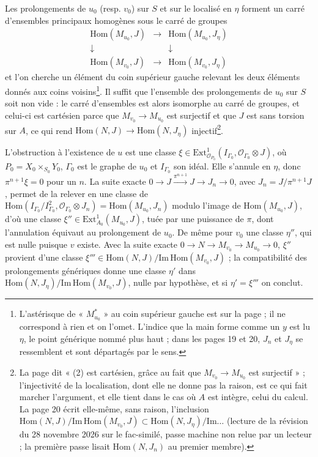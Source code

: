 \documentclass[11pt,a4paper]{article}
\begin{document}
Les prolongements de $u_0$ (resp. $v_0$) sur $S$ et sur le localisé en $\eta$
forment un carré d'ensembles principaux homogènes sous le carré de groupes
\[
\begin{array}{ccc}
\mathrm{Hom}(M_{u_0}, J) & \longrightarrow & \mathrm{Hom}(M_{u_0}, J_\eta)\\
\downarrow & & \downarrow\\
\mathrm{Hom}(M_{v_0}, J) & \longrightarrow & \mathrm{Hom}(M_{v_0}, J_\eta)
\end{array}
\]
et l'on cherche un élément du coin supérieur gauche relevant les deux
éléments donnés aux coins voisins\footnote{L'astérisque de « $M_{u_0}^{*}$ »
au coin supérieur gauche est sur la page ; il ne correspond à rien et on
l'omet. L'indice que la main forme comme un $y$ est lu $\eta$, le point
générique nommé plus haut ; dans les pages 19 et 20, $J_n$ et $J_\eta$ se
ressemblent et sont départagés par le sens.}. Il suffit que l'ensemble des
prolongements de $u_0$ sur $S$ soit non vide : le carré d'ensembles est alors
isomorphe au carré de groupes, et celui-ci est cartésien parce que
$M_{v_0} \to M_{u_0}$ est surjectif et que $J$ est sans torsion sur $A$, ce qui
rend $\mathrm{Hom}(N, J) \to \mathrm{Hom}(N, J_\eta)$ injectif\footnote{La page dit
« (2) est cartésien, grâce au fait que $M_{v_0} \to M_{u_0}$ est surjectif » ;
l'injectivité de la localisation, dont elle ne donne pas la raison, est ce
qui fait marcher l'argument, et elle tient dans le cas où $A$ est intègre,
celui du calcul. La page 20 écrit elle-même, sans raison, l'inclusion
$\mathrm{Hom}(N, J)/\mathrm{Im}\,\mathrm{Hom}(M_{v_0}, J) \subset \mathrm{Hom}(N,
J_\eta)/\mathrm{Im}\ldots$ (lecture de la révision du 28 novembre 2026 sur le fac-similé, passe machine non relue par un lecteur ; la première passe lisait
$\mathrm{Hom}(N, J_n)$ au premier membre).}.

L'obstruction à l'existence de $u$ est une classe
$\xi \in \mathrm{Ext}^1_{\mathcal{O}_{P_0}}(I_{\Gamma_0}, \mathcal{O}_{\Gamma_0}
\otimes J)$, où $P_0 = X_0 \times_{S_0} Y_0$, $\Gamma_0$ est le graphe de $u_0$ et
$I_{\Gamma_0}$ son idéal. Elle s'annule en $\eta$, donc $\pi^{n+1}\xi = 0$ pour un
$n$. La suite exacte $0 \to J \xrightarrow{\pi^{n+1}} J \to J_n \to 0$, avec
$J_n = J/\pi^{n+1}J$, permet de la relever en une classe de
$\mathrm{Hom}(I_{\Gamma_0}/I_{\Gamma_0}^2, \mathcal{O}_{\Gamma_0} \otimes J_n) =
\mathrm{Hom}(M_{u_0}, J_n)$ modulo l'image de $\mathrm{Hom}(M_{u_0}, J)$, d'où une
classe $\xi'' \in \mathrm{Ext}^1_{A_0}(M_{u_0}, J)$, tuée par une puissance de
$\pi$, dont l'annulation équivaut au prolongement de $u_0$. De même pour $v_0$
une classe $\eta''$, qui est nulle puisque $v$ existe. Avec la suite exacte
$0 \to N \to M_{v_0} \to M_{u_0} \to 0$, $\xi''$ provient d'une classe
$\xi''' \in \mathrm{Hom}(N, J)/\mathrm{Im}\,\mathrm{Hom}(M_{v_0}, J)$ ; la compatibilité
des prolongements génériques donne une classe $\eta'$ dans
$\mathrm{Hom}(N, J_\eta)/\mathrm{Im}\,\mathrm{Hom}(M_{v_0}, J)$, nulle par hypothèse, et
si $\eta' = \xi'''$ on conclut.
\end{document}
